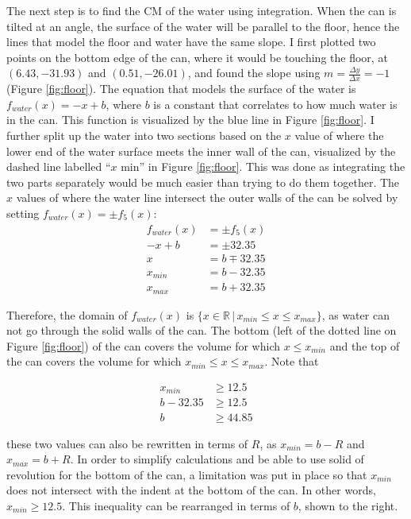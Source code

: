 \documentclass[11pt]{article}
\begin{document}
    The next step is to find the CM of the water using integration. When the can is tilted at an angle, the surface of the water will be parallel to the floor, hence the lines that model the floor and water have the same slope. I first plotted two points on the bottom edge of the can, where it would be touching the floor, at $(6.43, -31.93)$ and $(0.51, -26.01)$, and found the slope using $m = \frac{\Delta y}{\Delta x} = -1$ (Figure \ref{fig:floor}). The equation that models the surface of the water is $f_{water}(x) = -x + b$, where $b$ is a constant that correlates to how much water is in the can. This function is visualized by the blue line in Figure \ref{fig:floor}. I further split up the water into two sections based on the $x$ value of where the lower end of the water surface meets the inner wall of the can, visualized by the dashed line labelled ``$x$ min'' in Figure \ref{fig:floor}. This was done as integrating the two parts separately would be much easier than trying to do them together. The $x$ values of where the water line intersect the outer walls of the can be solved by setting $f_{water}(x) = \pm f_5(x)$:
    {\footnotesize\begin{align*}
        f_{water}(x) &= \pm f_5(x) \\
        -x + b &= \pm 32.35 \\
        x &= b \mp 32.35 \\
        x_{min} &= b - 32.35 \\
        x_{max} &= b + 32.35
    \end{align*}}

    Therefore, the domain of $f_{water}(x)$ is $\{ x \in \mathbb{R} \, | \, x_{min} \le x \le x_{max} \}$, as water can not go through the solid walls of the can. The bottom (left of the dotted line on Figure \ref{fig:floor}) of the can covers the volume for which ${x \le x_{min}}$ and the top of the can covers the volume for which ${x_{min} \le x \le x_{max}}$. Note that
    \begin{figure}
        \vspace{-10pt}
        {\footnotesize\begin{align*}
            x_{min} &\ge 12.5 \\
            b - 32.35 &\ge 12.5 \\
            b &\ge 44.85
        \end{align*}}
    \end{figure}
    these two values can also be rewritten in terms of $R$, as $x_{min} = b - R$ and $x_{max} = b + R$. In order to simplify calculations and be able to use solid of revolution for the bottom of the can, a limitation was put in place so that $x_{min}$ does not intersect with the indent at the bottom of the can. In other words, $x_{min} \ge 12.5$. This inequality can be rearranged in terms of $b$, shown to the right.
\end{document}
